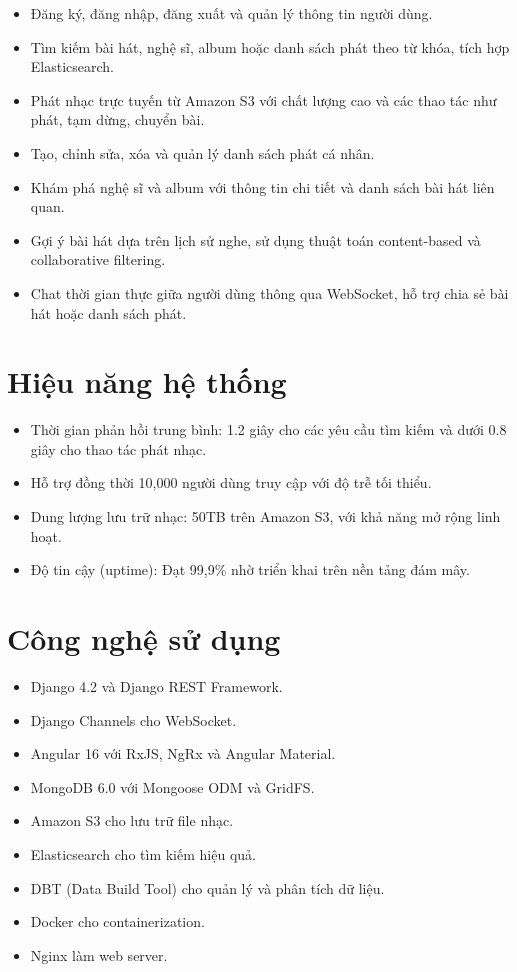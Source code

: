 \documentclass[a4paper,12pt]{report}
\begin{document}
\begin{itemize}
    \item Đăng ký, đăng nhập, đăng xuất và quản lý thông tin người dùng.
    \item Tìm kiếm bài hát, nghệ sĩ, album hoặc danh sách phát theo từ khóa, tích hợp Elasticsearch.
    \item Phát nhạc trực tuyến từ Amazon S3 với chất lượng cao và các thao tác như phát, tạm dừng, chuyển bài.
    \item Tạo, chỉnh sửa, xóa và quản lý danh sách phát cá nhân.
    \item Khám phá nghệ sĩ và album với thông tin chi tiết và danh sách bài hát liên quan.
    \item Gợi ý bài hát dựa trên lịch sử nghe, sử dụng thuật toán content-based và collaborative filtering.
    \item Chat thời gian thực giữa người dùng thông qua WebSocket, hỗ trợ chia sẻ bài hát hoặc danh sách phát.
\end{itemize}

\section{Hiệu năng hệ thống}
\begin{itemize}
    \item Thời gian phản hồi trung bình: 1.2 giây cho các yêu cầu tìm kiếm và dưới 0.8 giây cho thao tác phát nhạc.
    \item Hỗ trợ đồng thời 10,000 người dùng truy cập với độ trễ tối thiểu.
    \item Dung lượng lưu trữ nhạc: 50TB trên Amazon S3, với khả năng mở rộng linh hoạt.
    \item Độ tin cậy (uptime): Đạt 99,9\% nhờ triển khai trên nền tảng đám mây.
\end{itemize}

\section{Công nghệ sử dụng}
\begin{itemize}
    \item Django 4.2 và Django REST Framework.
    \item Django Channels cho WebSocket.
    \item Angular 16 với RxJS, NgRx và Angular Material.
    \item MongoDB 6.0 với Mongoose ODM và GridFS.
    \item Amazon S3 cho lưu trữ file nhạc.
    \item Elasticsearch cho tìm kiếm hiệu quả.
    \item DBT (Data Build Tool) cho quản lý và phân tích dữ liệu.
    \item Docker cho containerization.
    \item Nginx làm web server.
\end{itemize}
\end{document}

